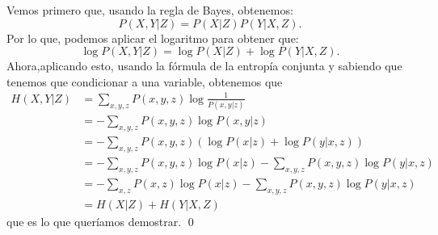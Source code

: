 \documentclass[a4paper]{article}
\begin{document}
Vemos primero que, usando la regla de Bayes, obtenemos:
\[
P(X,Y|Z) = P(X | Z) P(Y|X,Z).   
\]
Por lo que, podemos aplicar el logaritmo para obtener que:
\[
 \log P(X,Y|Z) = \log P(X | Z)+ \log P(Y|X,Z). 
\]
Ahora,aplicando esto, usando la fórmula de la entropía conjunta y sabiendo que tenemos que condicionar a una variable, obtenemos que
\begin{align*}
H(X,Y|Z) & = \sum_{x,y,z} P(x,y,z) \log \frac{1}{P(x,y|z)}\\
& = - \sum_{x,y,z} P(x,y,z) \log P(x,y|z) \\
& = - \sum_{x,y,z} P(x,y,z) \left(\log P(x|z) + \log P(y|x,z)\right)\\
& = - \sum_{x,y,z} P(x,y,z) \log P(x|z) - \sum_{x,y,z} P(x,y,z) \log P(y|x,z)\\
& = - \sum_{x,z} P(x,z) \log P(x|z) - \sum_{x,y,z} P(x,y,z) \log P(y|x,z)\\
& = H(X|Z) + H(Y|X,Z)
\end{align*}
que es lo que queríamos demostrar. \qed
\end{document}
